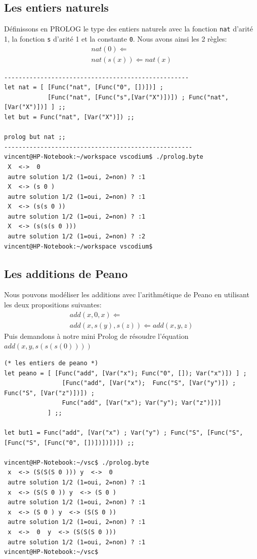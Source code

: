 \documentclass[11pt]{book}
\begin{document}
\subsection{Les entiers naturels}
Définissons en PROLOG le type des entiers naturels avec la fonction \verb+nat+ d'arité 1, la fonction \verb+s+
d'arité 1 et la constante \verb+0+.
Nous avons ainsi les 2 règles:
$$
\begin{array}{l}
nat(0) \Leftarrow \\
nat(s(x)) \Leftarrow nat(x)
\end{array}
$$
\begin{Verbatim}
---------------------------------------------------
let nat = [ [Func("nat", [Func("0", [])])] ;
            [Func("nat", [Func("s",[Var("X")])]) ; Func("nat", [Var("X")])] ] ;;
let but = Func("nat", [Var("X")]) ;; 

prolog but nat ;;
----------------------------------------------------
vincent@HP-Notebook:~/workspace vscodium$ ./prolog.byte 
 X  <->  0 
 autre solution 1/2 (1=oui, 2=non) ? :1
 X  <-> (s 0 )
 autre solution 1/2 (1=oui, 2=non) ? :1
 X  <-> (s(s 0 ))
 autre solution 1/2 (1=oui, 2=non) ? :1
 X  <-> (s(s(s 0 )))
 autre solution 1/2 (1=oui, 2=non) ? :2
vincent@HP-Notebook:~/workspace vscodium$ 
\end{Verbatim}

\subsection{Les additions de Peano}
Nous pouvons modéliser les additions avec l'arithmétique de Peano en utilisant les deux propositions suivantes:
$$
\begin{array}{l}
	add(x, 0, x) \Leftarrow \\
	add(x, s(y), s(z)) \Leftarrow  add(x,y,z)
\end{array}
$$
Puis demandons à notre mini Prolog de résoudre l'équation $add(x,y, s(s(s(0))))$
\begin{Verbatim}
(* les entiers de peano *)
let peano = [ [Func("add", [Var("x"); Func("0", []); Var("x")]) ] ;
				[Func("add", [Var("x");  Func("S", [Var("y")]) ; Func("S", [Var("z")])]) ;
				Func("add", [Var("x"); Var("y"); Var("z")])]
			] ;;

let but1 = Func("add", [Var("x") ; Var("y") ; Func("S", [Func("S", [Func("S", [Func("0", [])])])])]) ;; 

vincent@HP-Notebook:~/vsc$ ./prolog.byte 
 x  <-> (S(S(S 0 ))) y  <->  0 
 autre solution 1/2 (1=oui, 2=non) ? :1
 x  <-> (S(S 0 )) y  <-> (S 0 )
 autre solution 1/2 (1=oui, 2=non) ? :1
 x  <-> (S 0 ) y  <-> (S(S 0 ))
 autre solution 1/2 (1=oui, 2=non) ? :1
 x  <->  0  y  <-> (S(S(S 0 )))
 autre solution 1/2 (1=oui, 2=non) ? :1
vincent@HP-Notebook:~/vsc$ 
\end{Verbatim}
\end{document}
